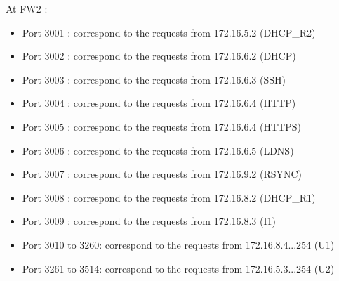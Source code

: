 \documentclass[a4paper,titlepage]{article}
\begin{document}
At FW2 :
\begin{itemize}
	\item Port 3001 : correspond to the requests from 172.16.5.2 (DHCP\_R2)
	\item Port 3002 : correspond to the requests from 172.16.6.2 (DHCP)
	\item Port 3003 : correspond to the requests from 172.16.6.3 (SSH)
	\item Port 3004 : correspond to the requests from 172.16.6.4 (HTTP)
	\item Port 3005 : correspond to the requests from 172.16.6.4 (HTTPS)
	\item Port 3006 : correspond to the requests from 172.16.6.5 (LDNS)
	\item Port 3007 : correspond to the requests from 172.16.9.2 (RSYNC)
	\item Port 3008 : correspond to the requests from 172.16.8.2 (DHCP\_R1)
	\item Port 3009 : correspond to the requests from 172.16.8.3 (I1)
	\item Port 3010 to 3260: correspond to the requests from 172.16.8.4...254 (U1)
	\item Port 3261 to 3514: correspond to the requests from 172.16.5.3...254 (U2)

\end{itemize}
\end{document}

